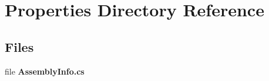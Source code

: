 \section{Properties Directory Reference}
\label{dir_c42fe981b443c4ea8353d6ab80c9df6f}
\subsection*{Files}
\begin{DoxyCompactItemize}
\item 
file {\bfseries Assembly\+Info.\+cs}
\end{DoxyCompactItemize}
